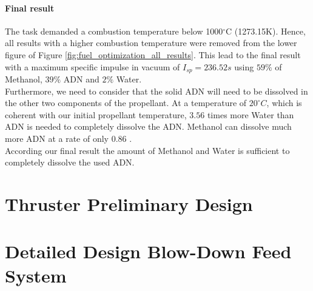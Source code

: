 \documentclass[12pt]{article}
\begin{document}
\paragraph{Final result}
The task demanded a combustion temperature below 1000$^\circ$C (1273.15K). Hence, all results with a higher combustion temperature were removed from the lower figure of Figure \ref{fig:fuel_optimization_all_results}. This lead to the final result with a maximum specific impulse in vacuum of $I_{sp}=236.52s$ using $59\%$ of Methanol, $39\%$ ADN and $2\%$ Water.\\

Furthermore, we need to consider that the solid ADN will need to be dissolved in the other two components of the propellant. At a temperature of $20^\circ C$, which is coherent with our initial propellant temperature, $3.56$ times more Water than ADN is needed to completely dissolve the ADN. Methanol can dissolve much more ADN at a rate of only $0.86$ \cite{Larsson2011}.\\

According our final result the amount of Methanol and Water is sufficient to completely dissolve the used ADN.



\section{Thruster Preliminary Design}

\section{Detailed Design Blow-Down Feed System}
\end{document}
